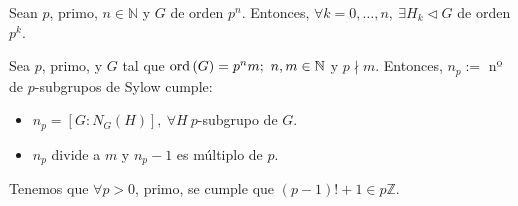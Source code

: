     \begin{coro}
        Sean $p$, primo, $n \in \mathbb{N}$ y $G$ de orden $p^n$. Entonces, $\forall k = 0, \ldots, n,\ \exists H_k \triangleleft G$ de orden $p^k$.
    \end{coro}

    \begin{theo}
        Sea $p$, primo, y $G$ tal que $\operatorname{ord} \left( G \right) = p^nm;\ n, m \in \mathbb{N}$ y $p \nmid m$. Entonces, $n_p :=$ nº de $p$-subgrupos de Sylow cumple:
        \begin{itemize}
            \item $n_p = \left[ G : N_G\left( H \right) \right],\ \forall H\ p$-subgrupo de $G$. 
            \item $n_p$ divide a $m$ y $n_p - 1$ es múltiplo de $p$.
        \end{itemize}
    \end{theo}

    \begin{coro}
        Tenemos que $\forall p > 0$, primo, se cumple que $\left( p - 1 \right)! + 1 \in p \mathbb{Z}$.
    \end{coro}
